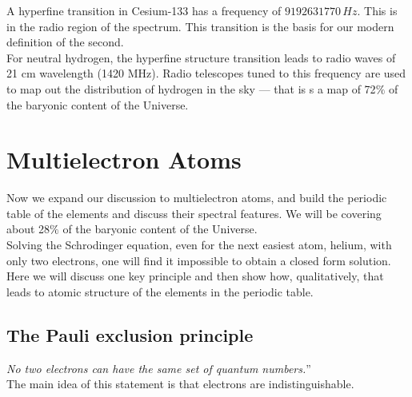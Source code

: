 \documentclass[11pt]{article}
\theoremstyle{break}
\theoremstyle{break}
\begin{document}
A hyperfine transition in Cesium-133 has a frequency of $9192631770\, Hz$. This is in the radio region of the spectrum. This transition is the basis for our modern definition of the second.\\

For neutral hydrogen, the hyperfine structure transition leads to radio waves of 21 cm wavelength (1420 MHz). Radio telescopes tuned to this frequency are used to map out the distribution of hydrogen in the sky — that is s a map of 72$\%$ of the baryonic content of the Universe.\\

\newpage
\section{Multielectron Atoms}
Now we expand our discussion to multielectron atoms, and build the periodic table of the elements and discuss their spectral features.
We will be covering about 28$\%$ of the baryonic content of the Universe.\\

Solving the Schrodinger equation, even for the next easiest atom, helium, with only two electrons, one will find it impossible to obtain a closed form solution. Here we will discuss one key principle and then show how, qualitatively, that leads to atomic structure of the elements in the periodic table.\\

\subsection{The Pauli exclusion principle}
\textit{No two electrons can have the same set of quantum numbers.}” \\The main idea of this statement is that electrons are indistinguishable. \\
\end{document}
